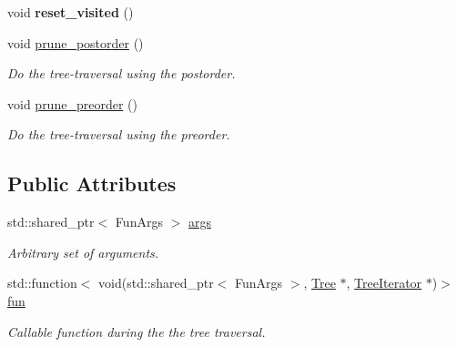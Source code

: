 \begin{DoxyCompactItemize}
\item 
void {\bfseries reset\+\_\+visited} ()\hypertarget{classTree_adb83bb19c14623ce57ac6d1b84b1c2ff}{}\label{classTree_adb83bb19c14623ce57ac6d1b84b1c2ff}

\item 
void \hyperlink{classTree_a7d465880d18acf79f3a772ea5412b0d7}{prune\+\_\+postorder} ()
\begin{DoxyCompactList}\small\item\em Do the tree-\/traversal using the postorder. \end{DoxyCompactList}\item 
void \hyperlink{classTree_ac85bfb083b3856e65987e1d15885a61c}{prune\+\_\+preorder} ()
\begin{DoxyCompactList}\small\item\em Do the tree-\/traversal using the preorder. \end{DoxyCompactList}\end{DoxyCompactItemize}
\subsection*{Public Attributes}
\begin{DoxyCompactItemize}
\item 
std\+::shared\+\_\+ptr$<$ Fun\+Args $>$ \hyperlink{classTree_ab9e870a9889c897bb6164eed1047b5eb}{args}\hypertarget{classTree_ab9e870a9889c897bb6164eed1047b5eb}{}\label{classTree_ab9e870a9889c897bb6164eed1047b5eb}

\begin{DoxyCompactList}\small\item\em Arbitrary set of arguments. \end{DoxyCompactList}\item 
std\+::function$<$ void(std\+::shared\+\_\+ptr$<$ Fun\+Args $>$, \hyperlink{classTree}{Tree} $\ast$, \hyperlink{classTreeIterator}{Tree\+Iterator} $\ast$)$>$ \hyperlink{classTree_aed3ea5ee55cf81fca64812e34a5050de}{fun}
\begin{DoxyCompactList}\small\item\em Callable function during the the tree traversal. \end{DoxyCompactList}\end{DoxyCompactItemize}
